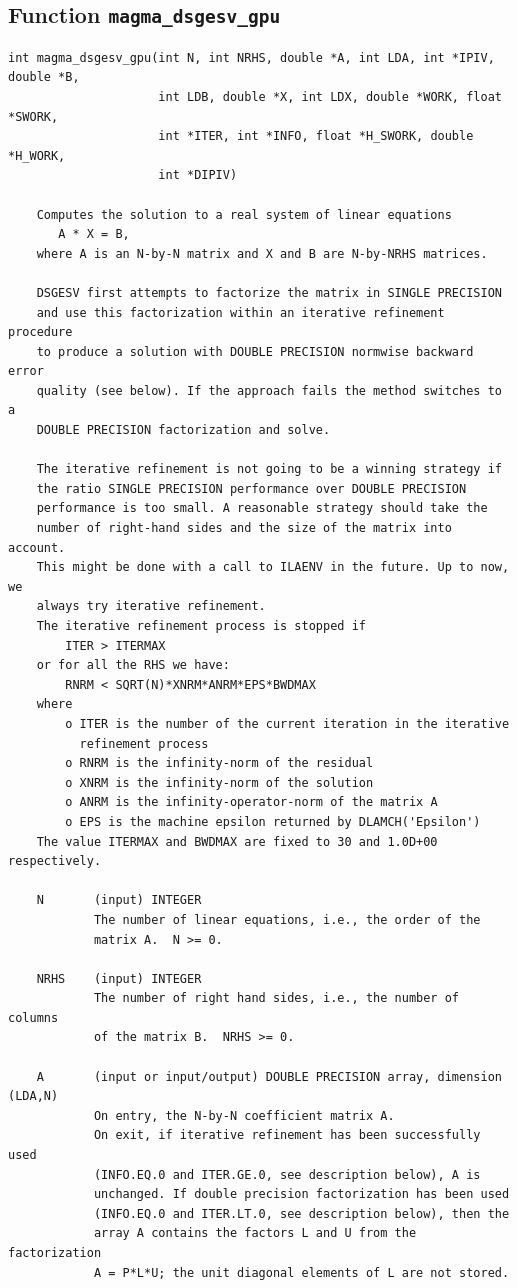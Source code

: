 \documentclass[10pt]{book}
\begin{document}
\subsection{Function {\tt {\bf magma\_dsgesv\_gpu}}}
\begin{verbatim}
int magma_dsgesv_gpu(int N, int NRHS, double *A, int LDA, int *IPIV, double *B, 
                     int LDB, double *X, int LDX, double *WORK, float *SWORK,
                     int *ITER, int *INFO, float *H_SWORK, double *H_WORK,
                     int *DIPIV)

    Computes the solution to a real system of linear equations
       A * X = B,
    where A is an N-by-N matrix and X and B are N-by-NRHS matrices.

    DSGESV first attempts to factorize the matrix in SINGLE PRECISION
    and use this factorization within an iterative refinement procedure
    to produce a solution with DOUBLE PRECISION normwise backward error
    quality (see below). If the approach fails the method switches to a
    DOUBLE PRECISION factorization and solve.

    The iterative refinement is not going to be a winning strategy if
    the ratio SINGLE PRECISION performance over DOUBLE PRECISION
    performance is too small. A reasonable strategy should take the
    number of right-hand sides and the size of the matrix into account.
    This might be done with a call to ILAENV in the future. Up to now, we
    always try iterative refinement.
    The iterative refinement process is stopped if
        ITER > ITERMAX
    or for all the RHS we have:
        RNRM < SQRT(N)*XNRM*ANRM*EPS*BWDMAX
    where
        o ITER is the number of the current iteration in the iterative
          refinement process
        o RNRM is the infinity-norm of the residual
        o XNRM is the infinity-norm of the solution
        o ANRM is the infinity-operator-norm of the matrix A
        o EPS is the machine epsilon returned by DLAMCH('Epsilon')
    The value ITERMAX and BWDMAX are fixed to 30 and 1.0D+00 respectively.

    N       (input) INTEGER
            The number of linear equations, i.e., the order of the
            matrix A.  N >= 0.

    NRHS    (input) INTEGER
            The number of right hand sides, i.e., the number of columns
            of the matrix B.  NRHS >= 0.

    A       (input or input/output) DOUBLE PRECISION array, dimension (LDA,N)
            On entry, the N-by-N coefficient matrix A.
            On exit, if iterative refinement has been successfully used
            (INFO.EQ.0 and ITER.GE.0, see description below), A is
            unchanged. If double precision factorization has been used
            (INFO.EQ.0 and ITER.LT.0, see description below), then the
            array A contains the factors L and U from the factorization
            A = P*L*U; the unit diagonal elements of L are not stored.


\end{verbatim}
\end{document}
